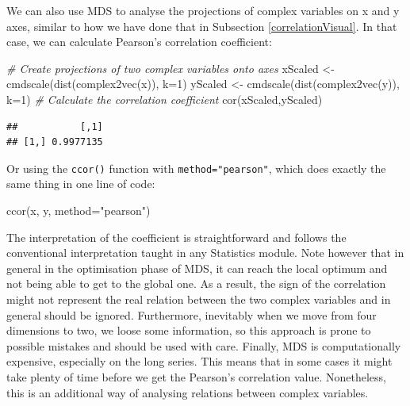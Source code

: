 \documentclass[
]{book}
\newenvironment{Shaded}{\begin{snugshade}}{\end{snugshade}}
\newcommand{\AttributeTok}[1]{\textcolor[rgb]{0.77,0.63,0.00}{#1}}
\newcommand{\CommentTok}[1]{\textcolor[rgb]{0.56,0.35,0.01}{\textit{#1}}}
\newcommand{\DecValTok}[1]{\textcolor[rgb]{0.00,0.00,0.81}{#1}}
\newcommand{\FunctionTok}[1]{\textcolor[rgb]{0.00,0.00,0.00}{#1}}
\newcommand{\NormalTok}[1]{#1}
\newcommand{\OtherTok}[1]{\textcolor[rgb]{0.56,0.35,0.01}{#1}}
\newcommand{\StringTok}[1]{\textcolor[rgb]{0.31,0.60,0.02}{#1}}
\begin{document}
We can also use MDS to analyse the projections of complex variables on x and y axes, similar to how we have done that in Subsection \ref{correlationVisual}. In that case, we can calculate Pearson's correlation coefficient:

\begin{Shaded}
\begin{Highlighting}[]
\CommentTok{\# Create projections of two complex variables onto axes}
\NormalTok{xScaled }\OtherTok{\textless{}{-}} \FunctionTok{cmdscale}\NormalTok{(}\FunctionTok{dist}\NormalTok{(}\FunctionTok{complex2vec}\NormalTok{(x)), }\AttributeTok{k=}\DecValTok{1}\NormalTok{)}
\NormalTok{yScaled }\OtherTok{\textless{}{-}} \FunctionTok{cmdscale}\NormalTok{(}\FunctionTok{dist}\NormalTok{(}\FunctionTok{complex2vec}\NormalTok{(y)), }\AttributeTok{k=}\DecValTok{1}\NormalTok{)}
\CommentTok{\# Calculate the correlation coefficient}
\FunctionTok{cor}\NormalTok{(xScaled,yScaled)}
\end{Highlighting}
\end{Shaded}

\begin{verbatim}
##           [,1]
## [1,] 0.9977135
\end{verbatim}

Or using the \texttt{ccor()} function with \texttt{method="pearson"}, which does exactly the same thing in one line of code:

\begin{Shaded}
\begin{Highlighting}[]
\FunctionTok{ccor}\NormalTok{(x, y, }\AttributeTok{method=}\StringTok{"pearson"}\NormalTok{)}
\end{Highlighting}
\end{Shaded}

The interpretation of the coefficient is straightforward and follows the conventional interpretation taught in any Statistics module. Note however that in general in the optimisation phase of MDS, it can reach the local optimum and not being able to get to the global one. As a result, the sign of the correlation might not represent the real relation between the two complex variables and in general should be ignored. Furthermore, inevitably when we move from four dimensions to two, we loose some information, so this approach is prone to possible mistakes and should be used with care. Finally, MDS is computationally expensive, especially on the long series. This means that in some cases it might take plenty of time before we get the Pearson's correlation value. Nonetheless, this is an additional way of analysing relations between complex variables.
\end{document}
